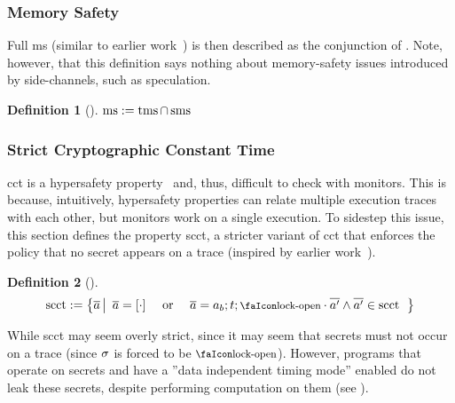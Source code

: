 \documentclass[dvipsnames,conference]{IEEEtran}
\theoremstyle{definition}
\newtheorem{definition}{Definition}[section]
\begin{document}
\subsubsection{Memory Safety}

Full \gls*{ms} (similar to earlier work~\cite{nagarakatte2009soft,nagarakatte2010cets,jim2002cyclone,necula2005ccured,michael2023mswasm}) is then described as the conjunction of .
Note, however, that this definition says nothing about memory-safety issues introduced by side-channels, such as speculation.

\begin{definition}[]\label{def:trace:msdef}
  $
  \operatorname{ms}:=\operatorname{tms} \cap \operatorname{sms}
  $
\end{definition}

\subsubsection{Strict Cryptographic Constant Time}

\gls*{cct} is a hypersafety property~\cite{barthe2018sec} and, thus, difficult to check with monitors.
This is because, intuitively, hypersafety properties can relate multiple execution traces with each other, but monitors work on a single execution.
To sidestep this issue, this section defines the property \gls*{scct}, a stricter variant of \gls*{cct} that enforces the policy that no secret appears on a trace (inspired by earlier work~\cite{almeida2017jasmin}).

\begin{definition}[]\label{def:trace:scctdef}
  $$
  \scctsafe:=\left\{\trace \left|\begin{array}{rcl}
                                   \trace=\hole{\cdot} & \text{ or } & \trace=\event[_{b}];\sandboxtag;\unlock\cdot\trace['] \wedge \trace[']\in\scctsafe
                                 \end{array}\right.\right\}
  $$
\end{definition}

While \gls*{scct} may seem overly strict, since it may seem that secrets must not occur on a trace (since $\sigma$ is forced to be $\unlock$). 
However, programs that operate on secrets and have a ''data independent timing mode'' enabled do not leak these secrets, despite performing computation on them (see ). 
\end{document}
